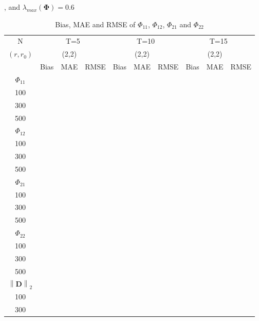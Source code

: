 \documentclass[12pt,a4paper,hyperref]{article}
\begin{document}
\begin{table}[H]
\caption{Bias, MAE and RMSE of $\Phi_{11}$, $\Phi_{12}$, $\Phi_{21}$ and $\Phi_{22}$}, and $\lambda_{max}(\boldsymbol{\Phi})=0.6$    \label{table1}
\centering
\tabcolsep=0.11cm
\begin{threeparttable}
\begin{tabular} {*{10}{c}}
\toprule
N& \multicolumn{3}{c}{T=5}&\multicolumn{3}{c}{T=10}&\multicolumn{3}{c}{T=15}\\
\cmidrule(lr){1-10}
$(r,r_{0})$ &   &(2,2)  &  &   &(2,2)  & &  &(2,2) & \\
\cmidrule(lr){1-4} \cmidrule(lr){5-7}\cmidrule(lr){8-10}
& \multicolumn{1}{c}{Bias} &\multicolumn{1}{c}{MAE}& \multicolumn{1}{c}{RMSE}&\multicolumn{1}{c}{Bias} &\multicolumn{1}{c}{MAE}& \multicolumn{1}{c}{RMSE}&\multicolumn{1}{c}{Bias}&\multicolumn{1}{c}{MAE} & \multicolumn{1}{c}{RMSE}\\
  \cmidrule(lr){2-4} \cmidrule(lr){5-7} \cmidrule(lr){8-10}
 $\Phi_{11}$\\
\cmidrule(lr){1-10}
 100&  & & &	  &	& & & &   \\
300&   &  & &	  &	&	& & &  \\
500& &  &   &	  &	& & & &	  \\
\cmidrule(lr){1-10}
$\Phi_{12}$\\
\cmidrule(lr){1-4}   \cmidrule(lr){5-7}   \cmidrule(lr){8-10}
  100&  & & &	  &	& & & &   \\
300&   &  & &	  &	&	& & &  \\
500& &  &   &	  &	& & & &	  \\
\cmidrule(lr){1-10}
$\Phi_{21}$\\
\cmidrule(lr){1-4}   \cmidrule(lr){5-7}   \cmidrule(lr){8-10}
 100&  & & &	  &	& & & &   \\
300&   &  & &	  &	&	& & &  \\
500& &  &   &	  &	& & & &	  \\
\cmidrule(lr){1-10}
$\Phi_{22}$\\
\cmidrule(lr){1-4}   \cmidrule(lr){5-7}   \cmidrule(lr){8-10}
 100&  & & &	  &	& & & &   \\
300&   &  & &	  &	&	& & &  \\
500& &  &   &	  &	& & & &	  \\
\cmidrule(lr){1-10}
$\left\| \boldsymbol{D} \right\|_{2} $\\
\cmidrule(lr){1-4}   \cmidrule(lr){5-7}   \cmidrule(lr){8-10}
100&  & & &	  &	& & & &   \\
300&   &  & &	  &	&	& & &  \\

\end{tabular}
\end{threeparttable}
\end{table}
\end{document}
